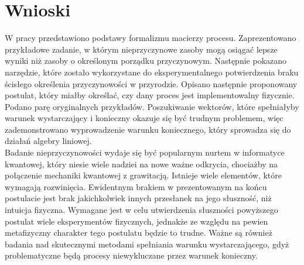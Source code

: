 \documentclass[10pt]{article} %
\begin{document}
\section{Wnioski}
W pracy przedstawiono podstawy formalizmu macierzy procesu. Zaprezentowano przykładowe zadanie, w którym nieprzyczynowe zasoby mogą osiągać lepsze wyniki niż zasoby o określonym porządku przyczynowym. Następnie pokazano narzędzie, które zostało wykorzystane do eksperymentalnego potwierdzenia
braku ścisłego określenia przyczynowości w przyrodzie. Opisano następnie proponowany postulat, który miałby określać, czy dany proces jest implementowalny fizycznie. Podano parę oryginalnych przykładów. Poszukiwanie wektorów, które spełniałyby warunek wystarczający i konieczny okazuje się być trudnym problemem, więc zademonstrowano wyprowadzenie 
warunku koniecznego, który sprowadza się do działań algebry liniowej.\\
Badanie nieprzyczynowości wydaje się być popularnym nurtem w informatyce kwantowej, który niesie wiele nadziei na nowe ważne odkrycia, chociażby na połączenie mechaniki kwantowej z grawitacją. Istnieje wiele elementów, które wymagają rozwinięcia.
Ewidentnym brakiem w prezentowanym na końcu postulacie jest brak jakichkolwiek innych przesłanek na jego słuszność, niż intuicja fizyczna. Wymagane jest w celu utwierdzenia słuszności powyższego postulat wiele eksperymentów fizycznych, jednakże ze względu na pewien metafizyczny charakter tego postulatu będzie to trudne.
Ważne są również badania nad skutecznymi metodami spełniania warunku wystarczającego, gdyż problematyczne będą procesy niewykluczane przez warunek konieczny. 

\renewcommand\appendixname{Dodatek}
\renewcommand\appendixpagename{Dodatek}
\newpage
\tableofcontents
\newpage
\listoffigures
\newpage
\end{document}

